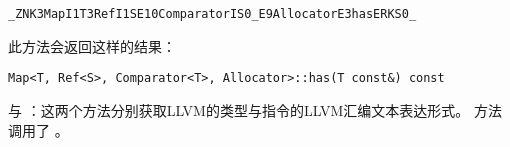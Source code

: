 \begin{lstlisting}
_ZNK3MapI1T3RefI1SE10ComparatorIS0_E9AllocatorE3hasERKS0_
\end{lstlisting}

此方法会返回这样的结果：

\begin{lstlisting}
Map<T, Ref<S>, Comparator<T>, Allocator>::has(T const&) const
\end{lstlisting}

 与 ：这两个方法分别获取LLVM的类型与指令的LLVM汇编文本表达形式。
方法  调用了 。

